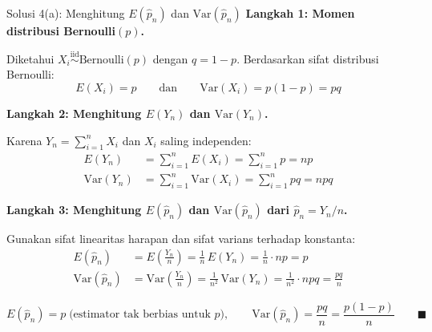 \documentclass[10pt,twoside]{article}
\begin{document}
\begin{solbox}{Solusi 4(a): Menghitung $E(\hat{p}_n)$ dan $\mathrm{Var}(\hat{p}_n)$}
\textbf{Langkah 1: Momen distribusi Bernoulli$(p)$.}

Diketahui $X_i \overset{\mathrm{iid}}{\sim} \mathrm{Bernoulli}(p)$ dengan $q = 1 - p$. Berdasarkan sifat distribusi Bernoulli:
\[
E(X_i) = p \qquad \text{dan} \qquad \mathrm{Var}(X_i) = p(1-p) = pq
\]

\textbf{Langkah 2: Menghitung $E(Y_n)$ dan $\mathrm{Var}(Y_n)$.}

Karena $Y_n = \sum_{i=1}^n X_i$ dan $X_i$ saling independen:
\begin{align*}
E(Y_n) &= \sum_{i=1}^n E(X_i) = \sum_{i=1}^n p = np \\
\mathrm{Var}(Y_n) &= \sum_{i=1}^n \mathrm{Var}(X_i) = \sum_{i=1}^n pq = npq
\end{align*}

\textbf{Langkah 3: Menghitung $E(\hat{p}_n)$ dan $\mathrm{Var}(\hat{p}_n)$ dari $\hat{p}_n = Y_n / n$.}

Gunakan sifat linearitas harapan dan sifat varians terhadap konstanta:
\begin{align*}
E(\hat{p}_n) &= E\left(\frac{Y_n}{n}\right) = \frac{1}{n}\,E(Y_n) = \frac{1}{n} \cdot np = p \\
\mathrm{Var}(\hat{p}_n) &= \mathrm{Var}\left(\frac{Y_n}{n}\right) = \frac{1}{n^2}\,\mathrm{Var}(Y_n) = \frac{1}{n^2} \cdot npq = \frac{pq}{n}
\end{align*}

\[
\boxed{E(\hat{p}_n) = p \;\text{(estimator tak berbias untuk } p\text{)}, \qquad \mathrm{Var}(\hat{p}_n) = \frac{pq}{n} = \frac{p(1-p)}{n}} \qquad \blacksquare
\]
\end{solbox}
\end{document}
